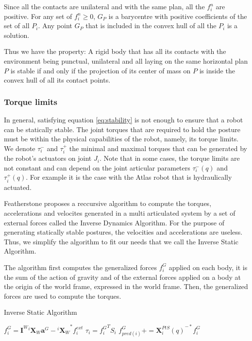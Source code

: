 Since all the contacts are unilateral and with the same plan, all the $f_i^n$ are positive.
For any set of $f_i^n\geq0$, $G_P$ is a barycentre with positive coefficients of the set of all $P_i$.
Any point $G_P$ that is included in the convex hull of all the $P_i$ is a solution.

Thus we have the property: A rigid body that has all its contacts with the environment being punctual, unilateral and all laying on the same horizontal plan $P$ is stable if and only if the projection of its center of mass on $P$ is inside the convex hull of all its contact points.

\subsubsection{Torque limits}
\label{subsub:torque_limits}

In general, satisfying equation \ref{eq:stability} is not enough to ensure that a robot can be statically stable.
The joint torques that are required to hold the posture must be within the physical capabilities of the robot, namely, its torque limits.
We denote $\tau_i^-$ and $\tau_i^+$ the minimal and maximal torques that can be generated by the robot's actuators on joint $J_i$.
Note that in some cases, the torque limits are not constant and can depend on the joint articular parameters $\tau_i^-(q)$ and $\tau_i^+(q)$.
For example it is the case with the Atlas robot that is hydraulically actuated.

Featherstone \cite{featherstone:book:2007} proposes a reccursive algorithm to compute the torques, accelerations and velocites generated in a multi articulated system by a set of external forces called the Inverse Dynamics Algorithm.
For the purpose of generating statically stable postures, the velocities and accelerations are useless.
Thus, we simplify the algorithm to fit our needs that we call the Inverse Static Algorithm.

The algorithm first computes the generalized forces $f^G_i$ applied on each body, it is the sum of the action of gravity and of the external forces applied on a body at the origin of the world frame, expressed in the world frame.
Then, the generalized forces are used to compute the torques.

\begin{algorithm}
  \caption{Inverse Static Algorithm}
  \label{IS}
\begin{algorithmic}
  \State $f^G_i = \mathbf{I}^W {}^i\mathbf{X}_W \mathbf{a}^G - {{}^i\mathbf{X}_W}^*f_i^{ext}$
  \EndFor
  \State $\tau_i = {f^G_i}^T S_i$
  \State $f^G_{pred(i)} += {\mathbf{X}^{PtS}_i(q)}^{-*} f^G_i$
  \EndIf
  \EndFor
\end{algorithmic}
\end{algorithm}

